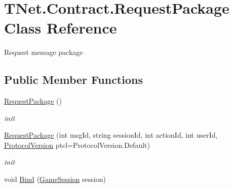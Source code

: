 \hypertarget{class_t_net_1_1_contract_1_1_request_package}{}\section{T\+Net.\+Contract.\+Request\+Package Class Reference}
\label{class_t_net_1_1_contract_1_1_request_package}


Request message package  


\subsection*{Public Member Functions}
\begin{DoxyCompactItemize}
\item 
\mbox{\hyperlink{class_t_net_1_1_contract_1_1_request_package_a4c7912019e2965e0bb2d996905285f5f}{Request\+Package}} ()
\begin{DoxyCompactList}\small\item\em init \end{DoxyCompactList}\item 
\mbox{\hyperlink{class_t_net_1_1_contract_1_1_request_package_a35e5e19a153b5ba9a7a7786b0092ca93}{Request\+Package}} (int msg\+Id, string session\+Id, int action\+Id, int user\+Id, \mbox{\hyperlink{namespace_t_net_1_1_service_a6651119df6dac62b849ed58cf7ece2bd}{Protocol\+Version}} ptcl=Protocol\+Version.\+Default)
\begin{DoxyCompactList}\small\item\em init \end{DoxyCompactList}\item 
void \mbox{\hyperlink{class_t_net_1_1_contract_1_1_request_package_aa0a9e1ab4593e289714e7c301bc79767}{Bind}} (\mbox{\hyperlink{class_t_net_1_1_contract_1_1_game_session}{Game\+Session}} session)
\end{DoxyCompactItemize}
